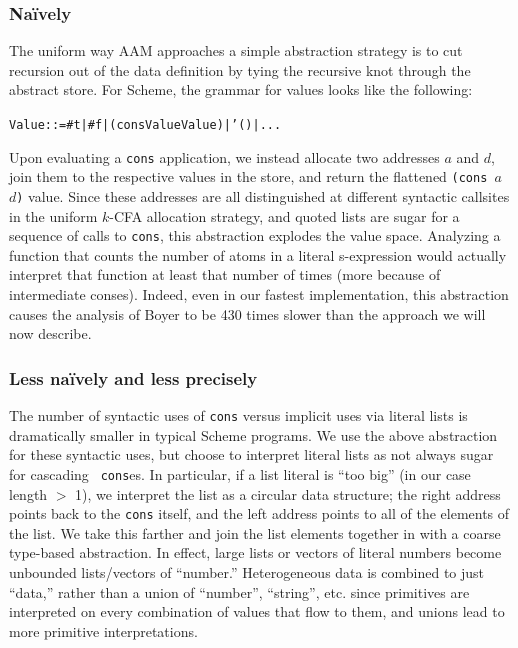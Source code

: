 \documentclass[preprint,onecolumn,9pt]{sigplanconf} %
\begin{document}
\subsubsection{Na\"ively}

The uniform way AAM approaches a simple abstraction strategy is to cut
recursion out of the data definition by tying the recursive knot
through the abstract store. For Scheme, the grammar for values looks
like the following:

\begin{alltt}
Value ::= #t | #f | (cons Value Value) | '() | ...
\end{alltt}

Upon evaluating a {\tt cons} application, we instead allocate two
addresses $a$ and $d$, join them to the respective values in the
store, and return the flattened {\tt (cons $a$ $d$)} value. Since
these addresses are all distinguished at different syntactic callsites
in the uniform $k$-CFA allocation strategy, and quoted lists are sugar
for a sequence of calls to {\tt cons}, this abstraction explodes the
value space. Analyzing a function that counts the number of atoms in a
literal s-expression would actually interpret that function at least
that number of times (more because of intermediate conses). Indeed,
even in our fastest implementation, this abstraction causes the
analysis of Boyer to be 430 times slower than the approach we will now
describe.

\subsubsection{Less na\"ively and less precisely}

The number of syntactic uses of {\tt cons} versus implicit uses via
literal lists is dramatically smaller in typical Scheme programs. We
use the above abstraction for these syntactic uses, but choose to
interpret literal lists as not always sugar for cascading {\tt
  cons}es. In particular, if a list literal is ``too big'' (in our
case length $>$ 1), we interpret the list as a circular data
structure; the right address points back to the {\tt cons} itself, and
the left address points to all of the elements of the list. We take
this farther and join the list elements together in with a coarse
type-based abstraction. In effect, large lists or vectors of literal
numbers become unbounded lists/vectors of ``number.'' Heterogeneous
data is combined to just ``data,'' rather than a union of ``number'',
``string'', etc. since primitives are interpreted on every combination
of values that flow to them, and unions lead to more primitive
interpretations.
\end{document}
